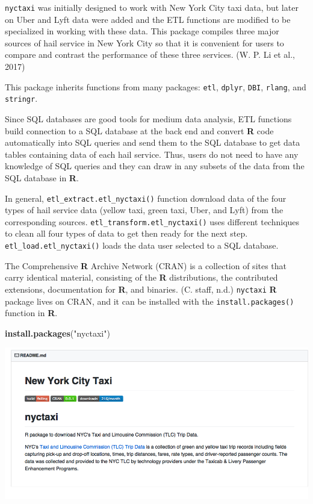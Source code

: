 \documentclass[12pt,twoside]{reedthesis}
\newenvironment{Shaded}{\begin{snugshade}}{\end{snugshade}}
\newcommand{\KeywordTok}[1]{\textcolor[rgb]{0.13,0.29,0.53}{\textbf{#1}}}
\newcommand{\StringTok}[1]{\textcolor[rgb]{0.31,0.60,0.02}{#1}}
\newcommand{\NormalTok}[1]{#1}
\theoremstyle{definition}
\theoremstyle{definition}
\theoremstyle{definition}
\theoremstyle{remark}
\begin{document}
\texttt{nyctaxi} was initially designed to work with New York City taxi
data, but later on Uber and Lyft data were added and the ETL functions
are modified to be specialized in working with these data. This package
compiles three major sources of hail service in New York City so that it
is convenient for users to compare and contrast the performance of these
three services. (W. P. Li et al., 2017)

This package inherits functions from many packages: \texttt{etl},
\texttt{dplyr}, \texttt{DBI}, \texttt{rlang}, and \texttt{stringr}.

Since SQL databases are good tools for medium data analysis, ETL
functions build connection to a SQL database at the back end and convert
\textbf{R} code automatically into SQL queries and send them to the SQL
database to get data tables containing data of each hail service. Thus,
users do not need to have any knowledge of SQL queries and they can draw
in any subsets of the data from the SQL database in \textbf{R}.

In general, \texttt{etl\_extract.etl\_nyctaxi()} function download data
of the four types of hail service data (yellow taxi, green taxi, Uber,
and Lyft) from the corresponding sources.
\texttt{etl\_transform.etl\_nyctaxi()} uses different techniques to
clean all four types of data to get then ready for the next step.
\texttt{etl\_load.etl\_nyctaxi()} loads the data user selected to a SQL
database.

The Comprehensive \textbf{R} Archive Network (CRAN) is a collection of
sites that carry identical material, consisting of the \textbf{R}
distributions, the contributed extensions, documentation for \textbf{R},
and binaries. (C. staff, n.d.) \texttt{nyctaxi} \textbf{R} package lives
on CRAN, and it can be installed with the \texttt{install.packages()}
function in \textbf{R}.
\begin{Shaded}
\begin{Highlighting}[]
\KeywordTok{install.packages}\NormalTok{(}\StringTok{"nyctaxi"}\NormalTok{)}
\end{Highlighting}
\end{Shaded}
\begin{center}\includegraphics[width=5.88in]{figure/nyctaxi-page} \end{center}
\end{document}
